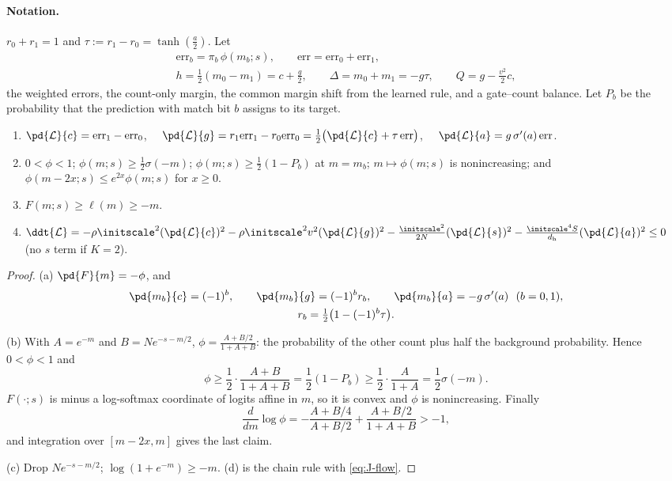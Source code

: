 \paragraph{Notation.} $r_0+r_1=1$ and $\tau:=r_1-r_0=\tanh(\frac{a}{2})$. Let
\begin{gather*}
 \mathrm{err}_b=\pi_b\,\phi(m_b;s),\qquad \mathrm{err}=\mathrm{err}_0+\mathrm{err}_1,\\
 h=\tfrac{1}{2}(m_0-m_1)=c+\tfrac{g}{2},\qquad \Delta=m_0+m_1=-g\tau,\qquad Q=g-\tfrac{v^2}{2}c,
\end{gather*}
the weighted errors, the count-only margin, the common margin shift from the learned rule, and a gate--count balance. Let $P_b$ be the
probability that the prediction with match bit $b$ assigns to its target.

\begin{lemma}[Derivatives]
\label{lem:J-geometry}
\begin{enumerate}[label=(\alph*),leftmargin=*,itemsep=2pt,topsep=3pt]
\item $\pd{\mathcal L}{c}=\mathrm{err}_1-\mathrm{err}_0$, $\quad\pd{\mathcal L}{g}=r_1\mathrm{err}_1-r_0\mathrm{err}_0=\tfrac{1}{2}\bigl(\pd{\mathcal L}{c}+\tau\,\mathrm{err}\bigr)$, $\quad\pd{\mathcal L}{a}=g\,\sigma'(a)\,\mathrm{err}$.
\item $0<\phi<1$; $\phi(m;s)\ge\frac{1}{2}\sigma(-m)$; $\phi(m;s)\ge\frac{1}{2}(1-P_b)$ at $m=m_b$; $m\mapsto\phi(m;s)$ is nonincreasing; and
$\phi(m-2x;s)\le e^{2x}\phi(m;s)$ for $x\ge0$.
\item $F(m;s)\ge\ell(m)\ge-m$.
\item $\ddt{\mathcal L}=-\rho\initscale^2(\pd{\mathcal L}{c})^2-\rho\initscale^2v^2(\pd{\mathcal L}{g})^2-\frac{\initscale^2}{2N}(\pd{\mathcal L}{s})^2-\frac{\initscale^4S}{d_{\mathrm h}}(\pd{\mathcal L}{a})^2\le0$ (no $s$ term if $K=2$).
\end{enumerate}
\end{lemma}

\begin{proof}
(a) $\pd{F}{m}=-\phi$, and
\begin{gather*}
 \pd{m_b}{c}=(-1)^b,\qquad \pd{m_b}{g}=(-1)^br_b,\qquad \pd{m_b}{a}=-g\,\sigma'(a)\ \ (b=0,1),\\
 r_b=\tfrac{1}{2}\bigl(1-(-1)^b\tau\bigr).
\end{gather*}

(b) With $A=e^{-m}$ and $B=Ne^{-s-m/2}$, $\phi=\frac{A+B/2}{1+A+B}$: the probability of the other count plus half the background
probability. Hence $0<\phi<1$ and
\[
 \phi\ge\frac{1}{2}\cdot\frac{A+B}{1+A+B}=\frac{1}{2}(1-P_b)\ge\frac{1}{2}\cdot\frac{A}{1+A}=\frac{1}{2}\sigma(-m).
\]
$F(\cdot;s)$ is minus a log-softmax coordinate of logits affine in $m$, so it is convex and $\phi$ is nonincreasing. Finally
\[
 \frac{d}{dm}\log\phi=-\frac{A+B/4}{A+B/2}+\frac{A+B/2}{1+A+B}>-1,
\]
and integration over $[m-2x,m]$ gives the last claim.

(c) Drop $Ne^{-s-m/2}$; $\log(1+e^{-m})\ge-m$. (d) is the chain rule with \cref{eq:J-flow}.
\end{proof}


